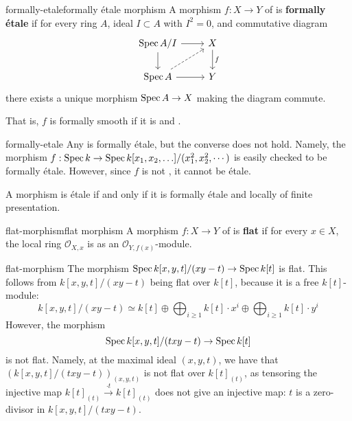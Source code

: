 \begin{topic}{formally-etale}{formally étale morphism}
    A morphism $f : X \to Y$ of  is \textbf{formally étale} if for every ring $A$, ideal $I \subset A$ with $I^2 = 0$, and commutative diagram
    \[ \begin{tikzcd} \Spec A/I \arrow{r} \arrow{d} & X \arrow{d}{f} \\ \Spec A \arrow{r} \arrow[dashed]{ur} & Y \end{tikzcd} \]
    there exists a unique morphism $\operatorname{Spec} A \to X$ making the diagram commute.
    
    That is, $f$ is formally smooth if it is  and .
\end{topic}

\begin{example}{formally-etale}
    Any  is formally étale, but the converse does not hold. Namely, the morphism $f : \operatorname{Spec} k \to \operatorname{Spec} k[x_1, x_2, \ldots] / (x_1^2, x_2^2, \cdots)$ is easily checked to be formally étale. However, since $f$ is not , it cannot be étale.
    
    A morphism is étale if and only if it is formally étale and locally of finite presentation.
\end{example}

\begin{topic}{flat-morphism}{flat morphism}
    A morphism $f : X \to Y$ of  is \textbf{flat} if for every $x \in X$, the local ring $\mathcal{O}_{X, x}$ is  as an $\mathcal{O}_{Y, f(x)}$-module.
\end{topic}

\begin{example}{flat-morphism}
    The morphism $\operatorname{Spec} k[x, y, t] / (xy - t) \to \operatorname{Spec} k[t]$ is flat. This follows from $k[x, y, t] / (xy - t)$ being flat over $k[t]$, because it is a free $k[t]$-module:
    \[ k[x, y, t] / (xy - t) \simeq k[t] \oplus \bigoplus_{i \ge 1} k[t] \cdot x^i \oplus \bigoplus_{i \ge 1} k[t] \cdot y^i \]
    However, the morphism
    \[ \operatorname{Spec} k[x, y, t] / (txy - t) \to \operatorname{Spec} k[t] \]
    is not flat. Namely, at the maximal ideal $(x, y, t)$, we have that $(k[x, y, t] / (txy - t))_{(x, y, t)}$ is not flat over $k[t]_{(t)}$, as tensoring the injective map $k[t]_{(t)} \xrightarrow{\cdot t} k[t]_{(t)}$ does not give an injective map: $t$ is a zero-divisor in $k[x, y, t] / (txy - t)$.
\end{example}

